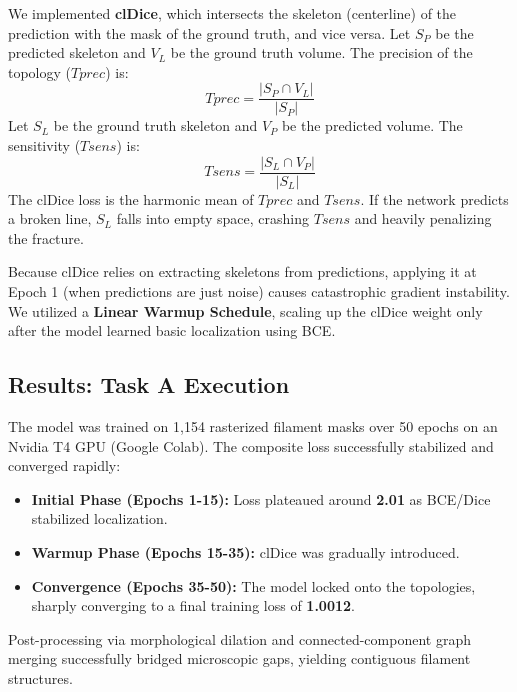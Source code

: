 \documentclass[12pt,a4paper]{article}
\begin{document}
We implemented \textbf{clDice}, which intersects the skeleton (centerline) of the prediction with the mask of the ground truth, and vice versa.
Let $S_P$ be the predicted skeleton and $V_L$ be the ground truth volume. The precision of the topology ($Tprec$) is:
\begin{equation}
    Tprec = \frac{|S_P \cap V_L|}{|S_P|}
\end{equation}
Let $S_L$ be the ground truth skeleton and $V_P$ be the predicted volume. The sensitivity ($Tsens$) is:
\begin{equation}
    Tsens = \frac{|S_L \cap V_P|}{|S_L|}
\end{equation}
The clDice loss is the harmonic mean of $Tprec$ and $Tsens$. If the network predicts a broken line, $S_L$ falls into empty space, crashing $Tsens$ and heavily penalizing the fracture.

\begin{KeyTakeaway}
Because clDice relies on extracting skeletons from predictions, applying it at Epoch 1 (when predictions are just noise) causes catastrophic gradient instability. We utilized a \textbf{Linear Warmup Schedule}, scaling up the clDice weight only after the model learned basic localization using BCE.
\end{KeyTakeaway}

\subsection{Results: Task A Execution}
The model was trained on 1,154 rasterized filament masks over 50 epochs on an Nvidia T4 GPU (Google Colab). The composite loss successfully stabilized and converged rapidly:
\begin{itemize}
    \item \textbf{Initial Phase (Epochs 1-15):} Loss plateaued around \textbf{2.01} as BCE/Dice stabilized localization.
    \item \textbf{Warmup Phase (Epochs 15-35):} clDice was gradually introduced.
    \item \textbf{Convergence (Epochs 35-50):} The model locked onto the topologies, sharply converging to a final training loss of \textbf{1.0012}.
\end{itemize}
Post-processing via morphological dilation and connected-component graph merging successfully bridged microscopic gaps, yielding contiguous filament structures.

\end{document}

